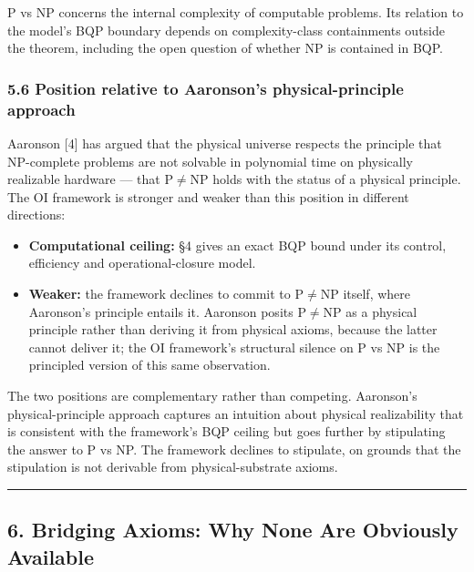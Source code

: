 \documentclass[
]{article}
\begin{document}
P vs NP concerns the internal complexity of computable problems. Its
relation to the model's BQP boundary depends on complexity-class
containments outside the theorem, including the open question of whether
NP is contained in BQP.

\hypertarget{position-relative-to-aaronsons-physical-principle-approach}{%
\subsubsection{5.6 Position relative to Aaronson's physical-principle
approach}\label{position-relative-to-aaronsons-physical-principle-approach}}

Aaronson {[}4{]} has argued that the physical universe respects the
principle that NP-complete problems are not solvable in polynomial time
on physically realizable hardware --- that
\(\mathrm{P} \neq \mathrm{NP}\) holds with the status of a physical
principle. The OI framework is stronger and weaker than this position in
different directions:

\begin{itemize}
\item
  \textbf{Computational ceiling:} §4 gives an exact BQP bound under its
  control, efficiency and operational-closure model.
\item
  \textbf{Weaker:} the framework declines to commit to
  \(\mathrm{P} \neq \mathrm{NP}\) itself, where Aaronson's principle
  entails it. Aaronson posits \(\mathrm{P} \neq \mathrm{NP}\) as a
  physical principle rather than deriving it from physical axioms,
  because the latter cannot deliver it; the OI framework's structural
  silence on P vs NP is the principled version of this same observation.
\end{itemize}

The two positions are complementary rather than competing. Aaronson's
physical-principle approach captures an intuition about physical
realizability that is consistent with the framework's BQP ceiling but
goes further by stipulating the answer to P vs NP. The framework
declines to stipulate, on grounds that the stipulation is not derivable
from physical-substrate axioms.

\begin{center}\rule{0.5\linewidth}{0.5pt}\end{center}

\hypertarget{bridging-axioms-why-none-are-obviously-available}{%
\subsection{6. Bridging Axioms: Why None Are Obviously
Available}\label{bridging-axioms-why-none-are-obviously-available}}
\end{document}
